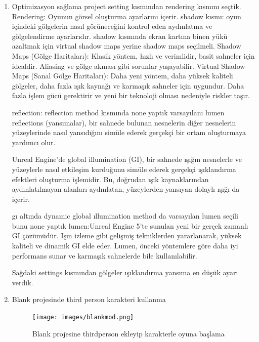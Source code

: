 \documentclass[12pt,a4paper]{article}
\begin{document}
	\begin{enumerate}
		\item Optimizasyon sağlama\newline
		project setting kısmından rendering kısmını seçtik.\newline
		Rendering: Oyunun görsel oluşturma ayarlarını içerir.\newline
		shadow kısmı: oyun içindeki gölgelerin nasıl görüneceğini kontrol eden aydınlatma ve gölgelendirme ayarlarıdır.\newline
		shadow kısmında ekran kartına binen yükü azaltmak için virtual shadow maps yerine shadow maps seçilmeli.\newline
		Shadow Maps (Gölge Haritaları): Klasik yöntem, hızlı ve verimlidir, basit sahneler için idealdir. Aliasing ve gölge akması gibi sorunlar yaşayabilir.\newline
		Virtual Shadow Maps (Sanal Gölge Haritaları): Daha yeni yöntem, daha yüksek kaliteli gölgeler, daha fazla ışık kaynağı ve karmaşık sahneler için uygundur. Daha fazla işlem gücü gerektirir ve yeni bir teknoloji olması nedeniyle riskler taşır.\newline
		
		reflection: reflection method kısmında none yaptık varsayılanı lumen
		reflections (yansımalar), bir sahnede bulunan nesnelerin diğer nesnelerin yüzeylerinde nasıl yansıdığını simüle ederek gerçekçi bir ortam oluşturmaya yardımcı olur.\newline
		
		Unreal Engine'de global illumination (GI), bir sahnede ışığın nesnelerle ve yüzeylerle nasıl etkileşim kurduğunu simüle ederek gerçekçi ışıklandırma efektleri oluşturma işlemidir. Bu, doğrudan ışık kaynaklarından aydınlatılmayan alanları aydınlatan, yüzeylerden yansıyan dolaylı ışığı da içerir.\newline
		
		gı altında dynamic global ıllumination method da varsayılan lumen seçili bunu none yaptık\newline
		lumen:Unreal Engine 5'te sunulan yeni bir gerçek zamanlı GI çözümüdür. Işın izleme gibi gelişmiş tekniklerden yararlanarak, yüksek kaliteli ve dinamik GI elde eder. Lumen, önceki yöntemlere göre daha iyi performans sunar ve karmaşık sahnelerde bile kullanılabilir.\newline
		
		Sağdaki settings kısmından gölgeler ışıklandırma yansıma en düşük ayarı verdik.	\newline\newline\newline
	    \item Blank projesinde third person karakteri kullanma 
	    	\begin{figure}[!htbp]
	    	\texttt{[image: images/blankmod.png]}
	    	\caption{Blank projesine thirdperson ekleyip karakterle oyuna başlama}
	    	\label{fig:ornek}
	      \end{figure}
		
	\end{enumerate}
\end{document}
